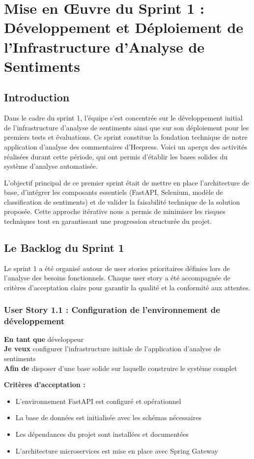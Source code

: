 \chapter{Mise en Œuvre du Sprint 1 : Développement et Déploiement de l'Infrastructure d'Analyse de Sentiments}

\section{Introduction}

Dans le cadre du sprint 1, l'équipe s'est concentrée sur le développement initial de l'infrastructure d'analyse de sentiments ainsi que sur son déploiement pour les premiers tests et évaluations. Ce sprint constitue la fondation technique de notre application d'analyse des commentaires d'Hespress. Voici un aperçu des activités réalisées durant cette période, qui ont permis d'établir les bases solides du système d'analyse automatisée.

L'objectif principal de ce premier sprint était de mettre en place l'architecture de base, d'intégrer les composants essentiels (FastAPI, Selenium, modèle de classification de sentiments) et de valider la faisabilité technique de la solution proposée. Cette approche itérative nous a permis de minimiser les risques techniques tout en garantissant une progression structurée du projet.

\section{Le Backlog du Sprint 1}

Le sprint 1 a été organisé autour de user stories prioritaires définies lors de l'analyse des besoins fonctionnels. Chaque user story a été accompagnée de critères d'acceptation clairs pour garantir la qualité et la conformité aux attentes.

\subsection{User Story 1.1 : Configuration de l'environnement de développement}

\textbf{En tant que} développeur \\
\textbf{Je veux} configurer l'infrastructure initiale de l'application d'analyse de sentiments \\
\textbf{Afin de} disposer d'une base solide sur laquelle construire le système complet

\textbf{Critères d'acceptation :}
\begin{itemize}
    \item L'environnement FastAPI est configuré et opérationnel
    \item La base de données est initialisée avec les schémas nécessaires
    \item Les dépendances du projet sont installées et documentées
    \item L'architecture microservices est mise en place avec Spring Gateway
\end{itemize}

